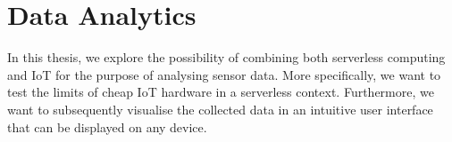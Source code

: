 \section{Data Analytics}

In this thesis, we explore the possibility of combining both serverless computing and IoT for the
purpose of analysing sensor data. More specifically, we want to test the limits of cheap IoT
hardware in a serverless context. Furthermore, we want to subsequently visualise the collected
data in an intuitive user interface that can be displayed on any device.
